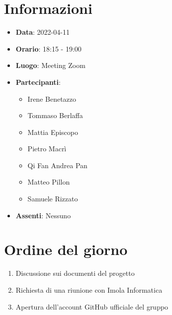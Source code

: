 \section{Informazioni}
	\begin{itemize}
		\item \textbf{Data}: 2022-04-11     %
		\item \textbf{Orario}: 18:15 - 19:00             %
		\item \textbf{Luogo}: Meeting Zoom
		\item \textbf{Partecipanti}:
		\begin{itemize}
			\item Irene Benetazzo
			\item Tommaso Berlaffa
			\item Mattia Episcopo
			\item Pietro Macrì
			\item Qi Fan Andrea Pan
			\item Matteo Pillon
			\item Samuele Rizzato
		\end{itemize}
        \item \textbf{Assenti}: Nessuno
	\end{itemize}
    
	\section{Ordine del giorno}
	\begin{enumerate}
		\item Discussione sui documenti del progetto
		\item Richiesta di una riunione con Imola Informatica
		\item Apertura dell'account GitHub ufficiale del gruppo
	\end{enumerate}
	\newpage